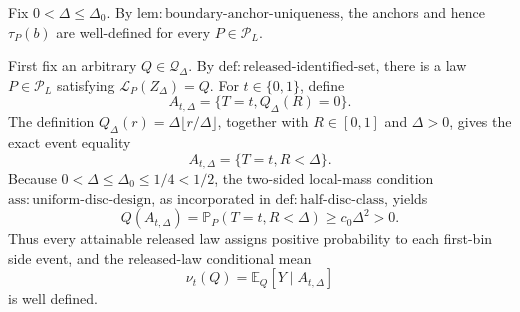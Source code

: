Fix \(0<\Delta\leq\Delta_0\).  By \(\mathrm{lem:boundary\text{-}anchor\text{-}uniqueness}\), the anchors and hence \(\tau_P(b)\) are well-defined for every \(P\in\mathcal P_L\).

First fix an arbitrary \(Q\in\mathcal Q_\Delta\).  By \(\mathrm{def:released\text{-}identified\text{-}set}\), there is a law \(P\in\mathcal P_L\) satisfying \(\mathcal L_P(Z_\Delta)=Q\).  For \(t\in\{0,1\}\), define
\[
 A_{t,\Delta}=\{T=t,Q_\Delta(R)=0\}.
\]
The definition \(Q_\Delta(r)=\Delta\lfloor r/\Delta\rfloor\), together with \(R\in[0,1]\) and \(\Delta>0\), gives the exact event equality
\[
 A_{t,\Delta}=\{T=t,R<\Delta\}.
\]
Because \(0<\Delta\leq\Delta_0\leq1/4<1/2\), the two-sided local-mass condition \(\mathrm{ass:uniform\text{-}disc\text{-}design}\), as incorporated in \(\mathrm{def:half\text{-}disc\text{-}class}\), yields
\[
 Q(A_{t,\Delta})
 =\mathbb P_P(T=t,R<\Delta)
 \geq c_0\Delta^2>0.
\]
Thus every attainable released law assigns positive probability to each first-bin side event, and the released-law conditional mean
\[
 \nu_t(Q)=\mathbb E_Q[Y\mid A_{t,\Delta}]
\]
is well defined.

